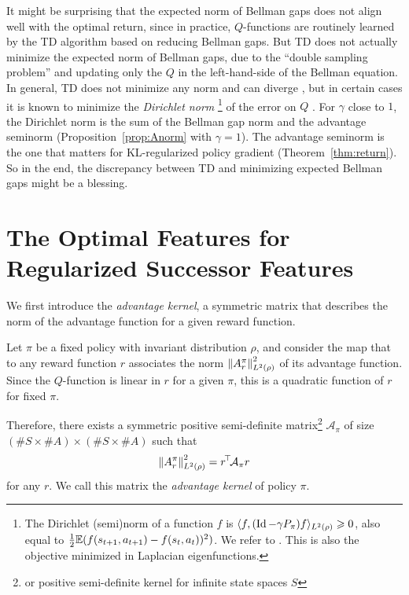 \documentclass[11pt,a4paper]{article}
\newcommand{\AK}{\mathcal{A}}
\newcommand{\TODO}[1]{{\color{red} TODO: {#1}}}
\newcommand{\todo}[1]{\TODO{#1}}
\newcommand{\option}[1]{{\color[rgb]{.4,0,.8}[Optional:#1]}} %
\renewcommand{\TODO}[1]{}
\renewcommand{\todo}[1]{}
\renewcommand{\option}[1]{}  %
\begin{document}
It might be surprising that the expected norm of Bellman gaps does not
align well with the optimal return, since in practice, $Q$-functions are
routinely learned by the TD algorithm based on reducing Bellman gaps. But
TD does not actually minimize the expected norm of Bellman gaps, due to
the ``double sampling problem'' and updating only the $Q$ in the
left-hand-side of the Bellman equation. In general, TD does not minimize
any norm and can diverge \cite{tsitsiklis1997approxtd}, but in certain cases it is known to
minimize the \emph{Dirichlet norm} \footnote{The Dirichlet (semi)norm of
a function $f$ is $\langle f,(\operatorname{Id} -\gamma
P_{\pi})f\rangle_{L^2(\rho)}\geqslant 0$, also equal to $\frac12\mathbb{E}
(f(s_{t+1},a_{t+1})-f(s_t,a_t))^2)$. We refer to \cite{tdconv}. This is also
the objective minimized in Laplacian eigenfunctions.} of the error on $Q$
\cite{tdconv}. For
$\gamma$ close to $1$, the Dirichlet norm is the sum of the Bellman gap
norm and the advantage seminorm (Proposition~\ref{prop:Anorm} with
$\gamma=1$\option{make that a separate statement}). The advantage seminorm
is the one that matters for KL-regularized policy gradient
(Theorem~\ref{thm:return}). So in
the end, the discrepancy between TD and minimizing expected Bellman gaps
might be a blessing.

\todo{explain: expected BG norm is just reconstruction error on $r$. This
completely ignores the dynamics, and also includes some irrelevant stuff
eg, adding constants to rewards. }

\section{The Optimal Features for Regularized Successor Features}

We first introduce the \emph{advantage kernel}, a symmetric matrix that
describes the norm of the advantage function for a given reward function.

\begin{defi}
\label{def:AK}
Let $\pi$ be a fixed policy with invariant distribution $\rho$, and consider the map that to any reward
function $r$ associates
the norm $\left\lVert A^{\pi}_r\right\rVert^2_{L^2(\rho)}$ of its advantage function.
Since the $Q$-function is linear in $r$ for a given $\pi$, this is a
quadratic function of $r$ for fixed $\pi$.

Therefore, there exists a symmetric positive semi-definite matrix\footnote{or
positive semi-definite kernel
for infinite state spaces $S$} $\AK_\pi$ of size $(\#S\times \#A)\times
(\#S\times \#A)$ such that
\begin{equation}
\norm{A^{\pi}_r}^2_{L^2(\rho)}=\transp{r} \AK_\pi r
\end{equation}
for any $r$. We call this matrix the \emph{advantage kernel} of policy
$\pi$.
\end{defi}
\end{document}
